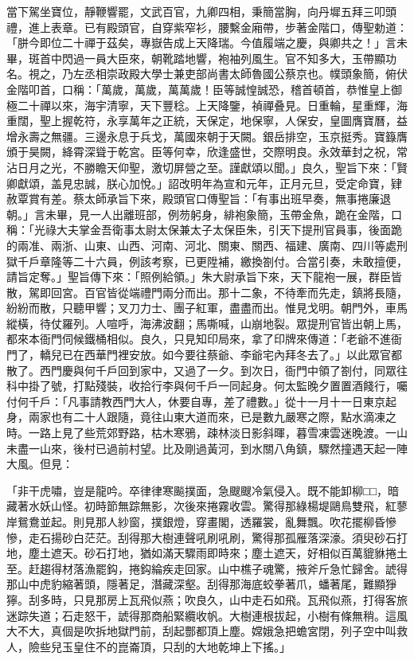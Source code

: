 當下駕坐寶位，靜鞭響罷，文武百官，九卿四相，秉簡當胸，向丹墀五拜三叩頭禮，進上表章。已有殿頭官，自穿紫窄衫，腰繫金廂帶，步著金階口，傳聖勅道：「胼今即位二十禪于茲矣，專嶽告成上天降瑞。今值履端之慶，與卿共之！」言未畢，斑首中閃過一員大臣來，朝靴踏地響，袍袖列風生。官不知多大，玉帶顯功名。視之，乃左丞相崇政殿大學士兼吏部尚書太師魯國公蔡京也。幞頭象簡，俯伏金階叩首，口稱：「萬歲，萬歲，萬萬歲！臣等誠惶誠恐，稽首頓首，恭惟皇上御極二十禪以來，海宇清寧，天下豐稔。上天降鑒，禎禪叠見。日重輪，星重輝，海重闊，聖上握乾符，永享萬年之正統，天保定，地保寧，人保安，皇圖膺寶曆，益增永壽之無疆。三邊永息于兵戈，萬國來朝于天闕。銀岳排空，玉京挺秀。寶籙膺頒于昊闕，絳霄深聳于乾宮。臣等何幸，欣逢盛世，交際明良。永效華封之祝，常沾日月之光，不勝瞻天仰聖，激切屏營之至。謹獻頌以聞。」良久，聖旨下來：「賢卿獻頌，盖見忠誠，朕心加悅。」詔改明年為宣和元年，正月元旦，受定命寶，肄赦覃賞有差。蔡太師承旨下來，殿頭官口傳聖旨：「有事出班早奏，無事捲廉退朝。」言未畢，見一人出離班部，例芴躬身，緋袍象簡，玉帶金魚，跪在金階，口稱：「光祿大夫掌金吾衛事太尉太保兼太子太保臣朱，引天下提刑官員事，後面跪的兩准、兩浙、山東、山西、河南、河北、關東、關西、福建、廣南、四川等處刑獄千戶章隆等二十六員，例該考察，已更陞補，繳換劄付。合當引奏，未敢擅便，請旨定奪。」聖旨傳下來：「照例給領。」朱大尉承旨下來，天下龍袍一展，群臣皆散，駕即回宮。百官皆從端禮門兩分而出。那十二象，不待牽而先走，鎮將長隨，紛紛而散，只聽甲響；叉刀力士、團子紅軍，盡盡而出。惟見戈明。朝門外，車馬縱橫，待仗羅列。人喧呼，海沸波翻；馬嘶喊，山崩地裂。眾提刑官皆出朝上馬，都來本衙門伺候鐵桶相似。良久，只見知印局來，拿了印牌來傳道：「老爺不進衙門了，轎兒已在西華門裡安放。如今要往蔡爺、李爺宅內拜冬去了。」以此眾官都散了。西門慶與何千戶回到家中，又過了一夕。到次日，衙門中領了劄付，同眾往科中掛了號，打點殘裝，收拾行李與何千戶一同起身。何太監晚夕置置酒餞行，囑付何千戶：「凡事請教西門大人，休要自專，差了禮數。」從十一月十一日東京起身，兩家也有二十人跟隨，竟往山東大道而來，已是數九嚴寒之際，點水滴凍之時。一路上見了些荒郊野路，枯木寒鴉，疎林淡日影斜暉，暮雪凍雲迷晚渡。一山未盡一山來，後村已過前村望。比及剛過黃河，到水關八角鎮，驟然撞遇天起一陣大風。但見：

「非干虎嘯，豈是龍吟。卒律律寒飈撲面，急颼颼冷氣侵入。既不能卸柳□□，暗藏著水妖山怪。初時節無踪無影，次後來捲霧收雲。驚得那綠楊堤鷗鳥雙飛，紅蓼岸鴛鴦並起。則見那人紗窗，撲銀燈，穿畫閣，透羅裳，亂舞飄。吹花擺柳昏慘慘，走石揚砂白茫茫。刮得那大樹連聲吼刷吼刷，驚得那孤雁落深濠。須臾砂石打地，塵土遮天。砂石打地，猶如滿天驟雨即時來；塵土遮天，好相似百萬貔貅捲土至。赶趨得材落漁罷鈎，捲鈎綸疾走回家。山中樵子魂驚，掖斧斤急忙歸舍。諕得那山中虎豹縮著頭，隱著足，潛藏深壑。刮得那海底蛟拳著爪，蟠著尾，難顯猙獰。刮多時，只見那房上瓦飛似燕；吹良久，山中走石如飛。瓦飛似燕，打得客旅迷踪失道；石走怒干，諕得那商船緊纜收帆。大樹連根拔起，小樹有條無稍。這風大不大，真個是吹拆地獄門前，刮起酆都頂上塵。嫦娥急把蟾宮閉，列子空中叫救人，險些兒玉皇住不的崑崙頂，只刮的大地乾坤上下搖。」


